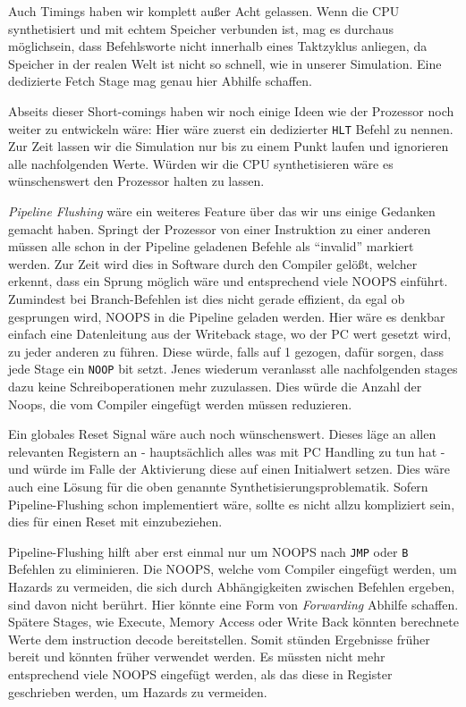 \documentclass[paper=a4,fontsize=12pt,twocolumn]{scrreprt}
\begin{document}
Auch Timings haben wir komplett außer Acht gelassen.
Wenn die CPU synthetisiert und mit echtem Speicher verbunden ist, mag es durchaus möglich\footnotemark sein, dass Befehlsworte nicht innerhalb eines Taktzyklus anliegen, da Speicher in der realen Welt ist nicht so schnell, wie in unserer Simulation.
Eine dedizierte Fetch Stage mag genau hier Abhilfe schaffen.

Abseits dieser Short-comings haben wir noch einige Ideen wie der Prozessor noch weiter zu entwickeln wäre:
Hier wäre zuerst ein dedizierter \texttt{HLT} Befehl zu nennen.
Zur Zeit lassen wir die Simulation nur bis zu einem Punkt laufen und ignorieren alle nachfolgenden Werte.
Würden wir die CPU synthetisieren wäre es wünschenswert den Prozessor halten zu lassen.

\textit{Pipeline Flushing} wäre ein weiteres Feature über das wir uns einige Gedanken gemacht haben.
Springt der Prozessor von einer Instruktion zu einer anderen müssen alle schon in der Pipeline geladenen Befehle als \enquote{invalid} markiert werden.
Zur Zeit wird dies in Software durch den Compiler gelößt, welcher erkennt, dass ein Sprung möglich wäre und entsprechend viele NOOPS einführt.
Zumindest bei Branch-Befehlen ist dies nicht gerade effizient, da egal ob gesprungen wird, NOOPS in die Pipeline geladen werden.
Hier wäre es denkbar einfach eine Datenleitung aus der Writeback stage, wo der PC wert gesetzt wird, zu jeder anderen zu führen.
Diese würde, falls auf 1 gezogen, dafür sorgen, dass jede Stage ein \texttt{NOOP} bit setzt.
Jenes wiederum veranlasst alle nachfolgenden stages dazu keine Schreiboperationen mehr zuzulassen.
Dies würde die Anzahl der Noops, die vom Compiler eingefügt werden müssen reduzieren.

Ein globales Reset Signal wäre auch noch wünschenswert.
Dieses läge an allen relevanten Registern an - hauptsächlich alles was mit PC Handling zu tun hat - und würde im Falle der Aktivierung diese auf einen Initialwert setzen.
Dies wäre auch eine Lösung für die oben genannte Synthetisierungsproblematik.
Sofern Pipeline-Flushing schon implementiert wäre, sollte es nicht allzu kompliziert sein, dies für einen Reset mit einzubeziehen.

Pipeline-Flushing hilft aber erst einmal nur um NOOPS nach \texttt{JMP} oder \texttt{B} Befehlen zu eliminieren.
Die NOOPS, welche vom Compiler eingefügt werden, um Hazards zu vermeiden, die sich durch Abhängigkeiten zwischen Befehlen ergeben, sind davon nicht berührt.
Hier könnte eine Form von \textit{Forwarding} Abhilfe schaffen.
Spätere Stages, wie Execute, Memory Access oder Write Back könnten berechnete Werte dem instruction decode bereitstellen.
Somit stünden Ergebnisse früher bereit und könnten früher verwendet werden.
Es müssten nicht mehr entsprechend viele NOOPS eingefügt werden, als das diese in Register geschrieben werden, um Hazards zu vermeiden.
\end{document}
